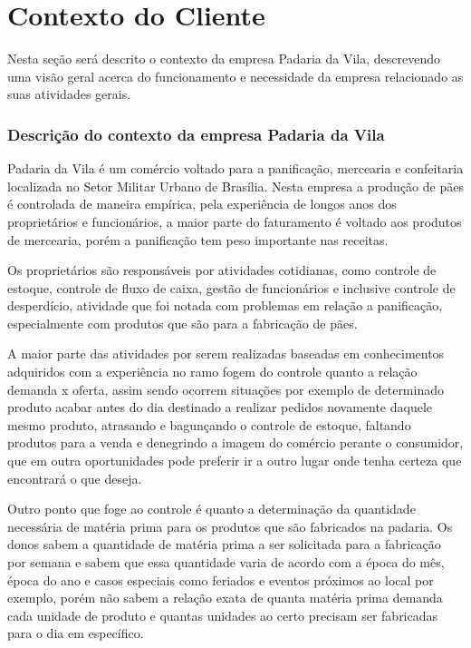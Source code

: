 \chapter{Contexto do Cliente}

Nesta seção será descrito o contexto da empresa Padaria da Vila, descrevendo uma visão geral acerca do funcionamento e necessidade da empresa relacionado as suas atividades gerais.

\subsection{Descrição do contexto da empresa Padaria da Vila}

Padaria da Vila é um comércio voltado para a panificação, mercearia e confeitaria localizada no Setor Militar Urbano de Brasília. Nesta empresa a produção de pães é controlada de maneira empírica, pela experiência de longos anos dos proprietários e funcionários, a maior parte do faturamento é voltado aos produtos de mercearia, porém a panificação tem peso importante nas receitas.

Os proprietários são responsáveis por atividades cotidianas, como controle de estoque, controle de fluxo de caixa, gestão de funcionários e inclusive controle de desperdício, atividade que foi notada com problemas em relação a panificação, especialmente com produtos que são  para a fabricação de pães.

A maior parte das atividades por serem realizadas baseadas em conhecimentos adquiridos com a experiência no ramo fogem do controle quanto a relação demanda x oferta, assim sendo ocorrem situações por exemplo de determinado produto acabar antes do dia destinado a realizar pedidos novamente daquele mesmo produto, atrasando e bagunçando o controle de estoque, faltando produtos para a venda e denegrindo a imagem do comércio perante o consumidor, que em outra oportunidades pode preferir ir a outro lugar onde tenha certeza que encontrará o que deseja.

Outro ponto que foge ao controle é quanto a determinação da quantidade necessária de matéria prima para os produtos que são fabricados na padaria. Os donos sabem a quantidade de matéria prima a ser solicitada para a fabricação por semana e sabem que essa quantidade varia de acordo com a época do mês, época do ano e casos especiais como feriados e eventos próximos ao local por exemplo, porém não sabem a relação exata de quanta matéria prima demanda cada unidade de produto e quantas unidades ao certo precisam ser fabricadas para o dia em específico.

